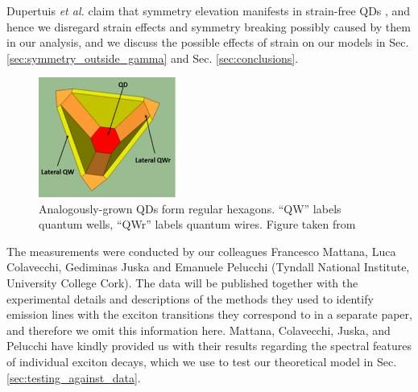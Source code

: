 \documentclass[12pt]{article}
\begin{document}
Dupertuis \textit{et al.} claim that symmetry elevation manifests in strain-free QDs \cite[p. 4]{dupertuis}, and hence we disregard strain effects and symmetry breaking possibly caused by them in our analysis, and we discuss the possible effects of strain on our models in Sec. \ref{sec:symmetry_outside_gamma} and Sec. \ref{sec:conclusions}.

\begin{figure}
\begin{center}
    \includegraphics[width=0.4\textwidth]{figures/hexagonal_qds}
 \caption{Analogously-grown QDs form regular hexagons. ``QW'' labels quantum wells, ``QWr'' labels quantum wires. Figure taken from \cite[Fig. 1]{hexagon}\label{fig:hexagonal_qds}}
\end{center}
\end{figure}

The measurements were conducted by our colleagues Francesco Mattana, Luca Colavecchi, Gediminas Juska and Emanuele Pelucchi (Tyndall National Institute, University College Cork). The data will be published together with the experimental details and descriptions of the methods they used to identify emission lines with the exciton transitions they correspond to in a separate paper, and therefore we omit this information here. Mattana, Colavecchi, Juska, and Pelucchi have kindly provided us with their results regarding the spectral features of individual exciton decays, which we use to test our theoretical model in Sec. \ref{sec:testing_against_data}. 

\pagebreak








\end{document}
